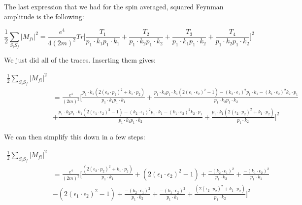 \documentclass[a4]{article}
\begin{document}
    The last expression that we had for the spin averaged, squared Feynman amplitude is the following:

    \begin{equation}
        \frac{1}{2} \sum_{S_i S_f} |M_{fi}|^2 = \frac{e^4}{4 (2m)^2} Tr \Bigg[ \frac{T_1}{p_1 \cdot k_1 p_1 \cdot k_1} + \frac{T_2}{p_1 \cdot k_2 p_1 \cdot k_2} + \frac{T_3}{p_1 \cdot k_1 p_1 \cdot k_2} + \frac{T_4}{p_1 \cdot k_2 p_1 \cdot k_2} \Bigg]^2
    \end{equation}

    We just did all of the traces. Inserting them gives:

    \begin{equation}
        \begin{aligned}
            \frac{1}{2} \sum_{S_i S_f} |M_{fi}|^2 & \\
            & = \frac{e^4}{(2m)^2} \Bigg[ \frac{p_1 \cdot k_1 (2 (\epsilon_2 \cdot p_2)^2 + k_1 \cdot p_2)}{p_1 \cdot k_1 p_1 \cdot k_1} + \frac{p_1 \cdot k_2 p_1 \cdot k_1 (2 (\epsilon_1 \cdot \epsilon_2)^2 - 1) - (k_2 \cdot \epsilon_1)^2 p_1 \cdot k_1 - (k_1 \cdot \epsilon_2)^2 k_2 \cdot p_1}{p_1 \cdot k_2 p_1 \cdot k_2} \\
            & + \frac{p_1 \cdot k_2 p_1 \cdot k_1 (2 (\epsilon_1 \cdot \epsilon_2)^2 - 1) - (k_2 \cdot \epsilon_1)^2 p_1 \cdot k_1 - (k_1 \cdot \epsilon_2)^2 k_2 \cdot p_1}{p_1 \cdot k_1 p_1 \cdot k_2} + \frac{p_1 \cdot k_1 (2 (\epsilon_2 \cdot p_2)^2 + k_1 \cdot p_2)}{p_1 \cdot k_2} \Bigg]^2
        \end{aligned}
    \end{equation}

    We can then simplify this down in a few steps:

    \begin{equation}
        \begin{aligned}
            \frac{1}{2} \sum_{S_i S_f} |M_{fi}|^2 & \\
            & = \frac{e^4}{(2m)^2} \Bigg[ \frac{(2 (\epsilon_2 \cdot p_2)^2 + k_1 \cdot p_2)}{p_1 \cdot k_1} + (2 (\epsilon_1 \cdot \epsilon_2)^2 - 1) + \frac{- (k_2 \cdot \epsilon_1)^2}{p_1 \cdot k_2} + \frac{- (k_1 \cdot \epsilon_2)^2}{p_1 \cdot k_1} \\
            & - (2 (\epsilon_1 \cdot \epsilon_2)^2 - 1) + \frac{- (k_2 \cdot \epsilon_1)^2}{p_1 \cdot k_2} + \frac{- (k_1 \cdot \epsilon_2)^2}{p_1 \cdot k_1} + \frac{(2 (\epsilon_2 \cdot p_2)^2 + k_1 \cdot p_2)}{p_1 \cdot k_2} \Bigg]^2
        \end{aligned}
    \end{equation}
\end{document}
